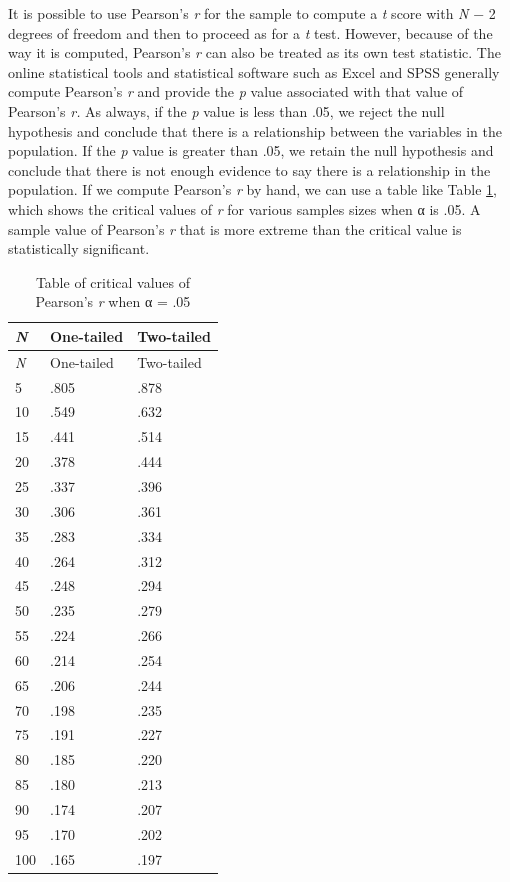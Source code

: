 \documentclass[
]{krantz}
\begin{document}
It is possible to use Pearson's \emph{r} for the sample to compute a \emph{t} score with \emph{N} − 2 degrees of freedom and then to proceed as for a \emph{t} test. However, because of the way it is computed, Pearson's \emph{r} can also be treated as its own test statistic. The online statistical tools and statistical software such as Excel and SPSS generally compute Pearson's \emph{r} and provide the \emph{p} value associated with that value of Pearson's \emph{r.} As always, if the \emph{p} value is less than .05, we reject the null hypothesis and conclude that there is a relationship between the variables in the population. If the \emph{p} value is greater than .05, we retain the null hypothesis and conclude that there is not enough evidence to say there is a relationship in the population. If we compute Pearson's \emph{r} by hand, we can use a table like Table \ref{tab:rcrit}, which shows the critical values of \emph{r} for various samples sizes when α is .05. A sample value of Pearson's \emph{r} that is more extreme than the critical value is statistically significant.

\begin{longtable}[]{@{}lll@{}}
\caption{\label{tab:rcrit} Table of critical values of Pearson's \emph{r} when α = .05}\tabularnewline
\toprule()
\emph{N} & One-tailed & Two-tailed \\
\midrule()
\endfirsthead
\toprule()
\emph{N} & One-tailed & Two-tailed \\
\midrule()
\endhead
5 & .805 & .878 \\
10 & .549 & .632 \\
15 & .441 & .514 \\
20 & .378 & .444 \\
25 & .337 & .396 \\
30 & .306 & .361 \\
35 & .283 & .334 \\
40 & .264 & .312 \\
45 & .248 & .294 \\
50 & .235 & .279 \\
55 & .224 & .266 \\
60 & .214 & .254 \\
65 & .206 & .244 \\
70 & .198 & .235 \\
75 & .191 & .227 \\
80 & .185 & .220 \\
85 & .180 & .213 \\
90 & .174 & .207 \\
95 & .170 & .202 \\
100 & .165 & .197 \\
\bottomrule()
\end{longtable}
\end{document}
